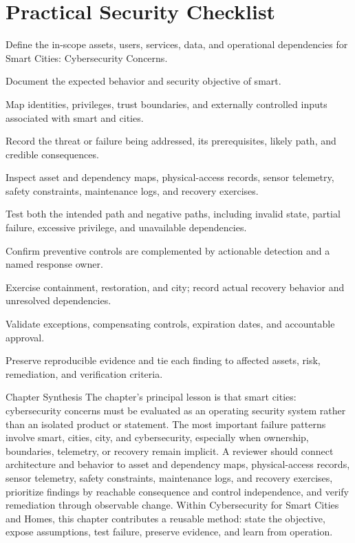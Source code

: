 \documentclass[11pt,letterpaper]{article}
\begin{document}
\section*{Practical Security Checklist}
\begin{CornellChecklist}
\item Define the in-scope assets, users, services, data, and operational dependencies for Smart Cities: Cybersecurity Concerns.
\item Document the expected behavior and security objective of smart.
\item Map identities, privileges, trust boundaries, and externally controlled inputs associated with smart and cities.
\item Record the threat or failure being addressed, its prerequisites, likely path, and credible consequences.
\item Inspect asset and dependency maps, physical-access records, sensor telemetry, safety constraints, maintenance logs, and recovery exercises.
\item Test both the intended path and negative paths, including invalid state, partial failure, excessive privilege, and unavailable dependencies.
\item Confirm preventive controls are complemented by actionable detection and a named response owner.
\item Exercise containment, restoration, and city; record actual recovery behavior and unresolved dependencies.
\item Validate exceptions, compensating controls, expiration dates, and accountable approval.
\item Preserve reproducible evidence and tie each finding to affected assets, risk, remediation, and verification criteria.
\end{CornellChecklist}
\begin{CornellSummaryBox}{Chapter Synthesis}
The chapter's principal lesson is that smart cities: cybersecurity concerns must be evaluated as an operating security system rather than an isolated product or statement. The most important failure patterns involve smart, cities, city, and cybersecurity, especially when ownership, boundaries, telemetry, or recovery remain implicit. A reviewer should connect architecture and behavior to asset and dependency maps, physical-access records, sensor telemetry, safety constraints, maintenance logs, and recovery exercises, prioritize findings by reachable consequence and control independence, and verify remediation through observable change. Within Cybersecurity for Smart Cities and Homes, this chapter contributes a reusable method: state the objective, expose assumptions, test failure, preserve evidence, and learn from operation.
\end{CornellSummaryBox}
\end{document}
